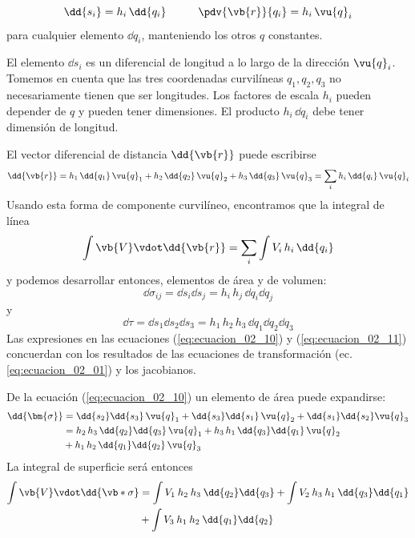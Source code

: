 \begin{equation}
\dd{s_{i}} = h_{i} \, \dd{q_{i}} \hspace{1cm} \pdv{\vb{r}}{q_{i}} = h_{i} \, \vu{q}_{i} 
\label{eq:ecuacion_02_09}
\end{equation}
para cualquier elemento $\dd{q_{i}}$, manteniendo los otros $q$ constantes.
\par
El elemento $\dd{s_{i}}$ es un diferencial de longitud a lo largo de la dirección $\vu{q}_{i}$. Tomemos en cuenta que las tres coordenadas curvilíneas $q_{1},q_{2},q_{3}$ no necesariamente tienen  que ser longitudes. Los factores de escala $h_{i}$ pueden depender de $q$ y pueden tener dimensiones. El producto $h_{i}\, \dd{q_{i}}$ debe tener dimensión de longitud. 
\par
El vector diferencial de distancia $\dd{\vb{r}}$ puede escribirse
\[ \dd{\vb{r}} =  h_{1} \, \dd{q_{1}} \, \vu{q}_{1} + h_{2} \, \dd{q_{2}} \, \vu{q}_{2} + h_{3} \, \dd{q_{3}} \, \vu{q}_{3} = \sum_{i} h_{i} \, \dd{q_{i}} \, \vu{q}_{i}  \]
Usando esta forma de componente curvilíneo, encontramos que la integral de línea
\[ \int \vb{V} \vdot \dd{\vb{r}} = \sum_{i} \int V_{i} \, h_{i}\,  \dd{q_{i}}  \]
y podemos desarrollar entonces, elementos de área y de volumen:
\begin{equation}
\dd{\sigma_{ij}} = \dd{s_{i}} \dd{s_{j}} =  h_{i} \, h_{j} \, \dd{q_{i}} \dd{q_{j}}
\label{eq:ecuacion_02_10}
\end{equation}
y
\begin{equation}
\dd{\tau} = \dd{s_{1}} \dd{s_{2}} \dd{s_{3}} =  h_{1} \, h_{2} \, h_{3} \, \dd{q_{1}} \dd{q_{2}} \dd{q_{3}}
\label{eq:ecuacion_02_11}
\end{equation}
Las expresiones en las ecuaciones (\ref{eq:ecuacion_02_10}) y (\ref{eq:ecuacion_02_11}) concuerdan con los resultados de las ecuaciones de transformación (ec. \ref{eq:ecuacion_02_01}) y los jacobianos.
\par
De la ecuación (\ref{eq:ecuacion_02_10}) un elemento de área puede expandirse:
\begin{align*}
\dd{\bm{\sigma}} &= \dd{s_{2}} \dd{s_{3}} \, \vu{q}_{1} + \dd{s_{3}} \dd{s_{1}} \, \vu{q}_{2} + \dd{s_{1}} \dd{s_{2}} \vu{q}_{3} \\
&= h_{2} \, h_{3} \, \dd{q_{2}} \dd{q_{3}} \, \vu{q}_{1} + h_{3} \, h_{1} \, \dd{q_{3}} \dd{q_{1}} \, \vu{q}_{2} \\
&+ h_{1} \, h_{2} \, \dd{q_{1}} \dd{q_{2}} \, \vu{q}_{3}
\end{align*}
La integral de superficie será entonces
\begin{align*}
\int \vb{V} \vdot \dd{\vb*{\sigma}} &= \int V_{1} \: h_{2} \: h_{3} \: \dd{q_{2}} \dd{q_{3}} + \int V_{2} \: h_{3} \: h_{1} \: \dd{q_{3}} \dd{q_{1}} \\
&+ \int V_{3} \: h_{1} \: h_{2} \: \dd{q_{1}} \dd{q_{2}}
\end{align*}
